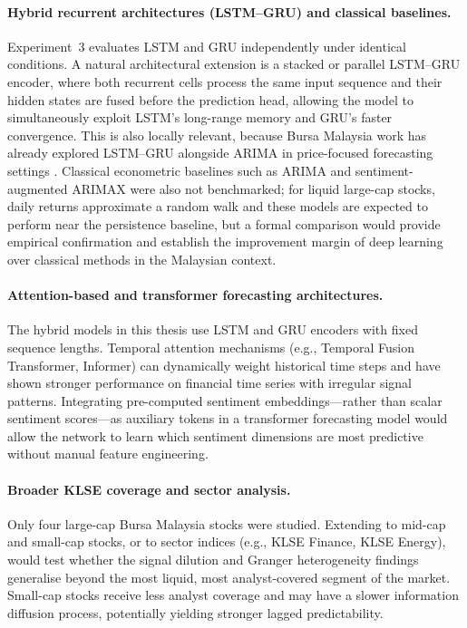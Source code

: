 \documentclass[12pt]{ucetd}
\begin{document}
\paragraph{Hybrid recurrent architectures (LSTM--GRU) and classical baselines.}
Experiment~3 evaluates LSTM and GRU independently under identical conditions. A natural architectural extension is a stacked or parallel LSTM--GRU encoder, where both recurrent cells process the same input sequence and their hidden states are fused before the prediction head, allowing the model to simultaneously exploit LSTM's long-range memory and GRU's faster convergence. This is also locally relevant, because Bursa Malaysia work has already explored LSTM--GRU alongside ARIMA in price-focused forecasting settings \cite{leong2021stock}. Classical econometric baselines such as ARIMA and sentiment-augmented ARIMAX were also not benchmarked; for liquid large-cap stocks, daily returns approximate a random walk and these models are expected to perform near the persistence baseline, but a formal comparison would provide empirical confirmation and establish the improvement margin of deep learning over classical methods in the Malaysian context.

\paragraph{Attention-based and transformer forecasting architectures.}
The hybrid models in this thesis use LSTM and GRU encoders with fixed sequence lengths. Temporal attention mechanisms (e.g., Temporal Fusion Transformer, Informer) can dynamically weight historical time steps and have shown stronger performance on financial time series with irregular signal patterns. Integrating pre-computed sentiment embeddings---rather than scalar sentiment scores---as auxiliary tokens in a transformer forecasting model would allow the network to learn which sentiment dimensions are most predictive without manual feature engineering.

\paragraph{Broader KLSE coverage and sector analysis.}
Only four large-cap Bursa Malaysia stocks were studied. Extending to mid-cap and small-cap stocks, or to sector indices (e.g., KLSE Finance, KLSE Energy), would test whether the signal dilution and Granger heterogeneity findings generalise beyond the most liquid, most analyst-covered segment of the market. Small-cap stocks receive less analyst coverage and may have a slower information diffusion process, potentially yielding stronger lagged predictability.
\end{document}
